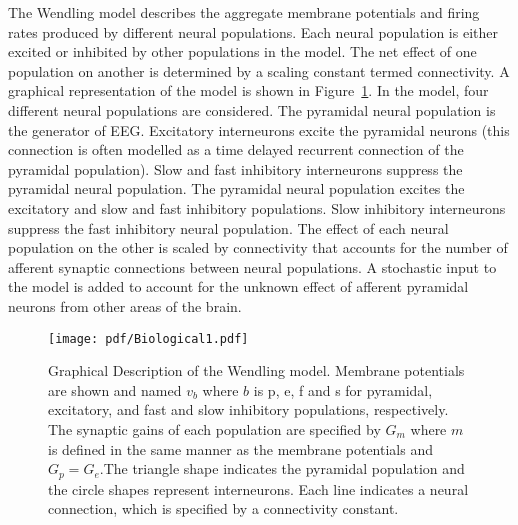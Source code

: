 The Wendling model describes the aggregate membrane potentials and firing rates produced by different neural populations. Each neural population is either excited or inhibited by other populations in the model. The net effect of one population on another is determined by a scaling constant termed connectivity. A graphical representation of the model is shown in Figure~\ref{fig: Biological}. In the model, four different neural populations are considered. The pyramidal neural population is the generator of EEG. Excitatory interneurons excite the pyramidal neurons (this connection is often modelled as a time delayed recurrent connection of the pyramidal population). Slow and fast inhibitory interneurons suppress the pyramidal neural population. The pyramidal neural population excites the excitatory and slow and fast inhibitory populations. Slow inhibitory interneurons suppress the fast inhibitory neural population. The effect of each neural population on the other is scaled by connectivity that accounts for the number of afferent synaptic connections between neural populations. A stochastic input to the model is added to account for the unknown effect of afferent pyramidal neurons from other areas of the brain.%
\begin{figure}  %
	\centering
		\texttt{[image: pdf/Biological1.pdf]}
	\caption{Graphical Description of the Wendling model. Membrane potentials are shown and named $v_{b}$ where $b$ is p, e, f and s for pyramidal, excitatory, and fast and slow inhibitory populations, respectively. The synaptic gains of each population are specified by $G_{m}$ where $m$ is defined in the same manner as the membrane potentials and $G_{p}=G_{e}$.The triangle shape indicates the pyramidal population and the circle shapes represent interneurons. Each line indicates a neural connection, which is specified by a connectivity constant.}
	\label{fig: Biological}
\end{figure}%

